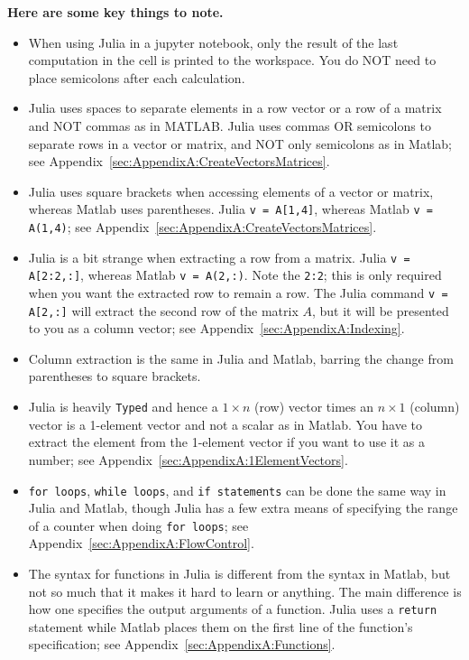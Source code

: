 \textbf{\large Here are some key things to note. }\\
\begin{itemize}
\item When using Julia in a jupyter notebook, only the result of the last computation in the cell is printed to the workspace. You do NOT need to place semicolons after each calculation.
\item Julia uses spaces to separate elements in a row vector or a row of a matrix and NOT commas as in MATLAB. Julia uses commas OR semicolons to separate rows in a vector or matrix, and NOT only semicolons as in Matlab; see Appendix~\ref{sec:AppendixA:CreateVectorsMatrices}.  
    \item Julia uses square brackets when accessing elements of a vector or matrix, whereas Matlab uses parentheses. Julia \texttt{v = A[1,4]}, whereas Matlab \texttt{v = A(1,4)}; see Appendix~\ref{sec:AppendixA:CreateVectorsMatrices}.
    \item Julia is a bit strange when extracting a row from a matrix. Julia \texttt{v = A[2:2,:]}, whereas Matlab \texttt{v = A(2,:)}. Note the \texttt{2:2}; this is only required when you want the extracted row to remain a row. The Julia command \texttt{v = A[2,:]} will extract the second row of the matrix $A$, but it will be presented to  you as a column vector; see Appendix~\ref{sec:AppendixA:Indexing}.
    \item Column extraction is the same in Julia and Matlab, barring the change from parentheses to square brackets.
    \item Julia is heavily \texttt{Typed} and hence a $1 \times n$ (row) vector times an $n \times 1$ (column) vector is a 1-element vector and not a scalar as in Matlab. You have to extract the element from the 1-element vector if you want to use it as a number; see Appendix~\ref{sec:AppendixA:1ElementVectors}.
    \item \texttt{for\,loops}, \texttt{while\,loops}, and \texttt{if statements} can be done the same way in Julia and Matlab, though Julia has a few extra means of specifying the range of a counter when doing \texttt{for\,loops}; see Appendix~\ref{sec:AppendixA:FlowControl}.
    \item The syntax for functions in Julia is different from the syntax in Matlab, but not so much that it makes it hard to learn or anything. The main difference is how one specifies the output arguments of a function. Julia uses a \texttt{return} statement while Matlab places them on the first line of the function's specification; see Appendix~\ref{sec:AppendixA:Functions}.

\end{itemize}
